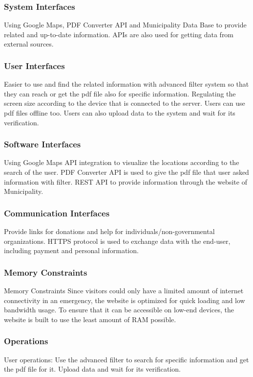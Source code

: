 \documentclass[12pt]{report}
\begin{document}
\subsubsection{System Interfaces}
Using Google Maps, PDF Converter API and Municipality Data Base to provide related and up-to-date information. APIs are also used for getting data from external sources.

\subsubsection{User Interfaces}
Easier to use and find the related information with advanced filter system so that they can reach or get the pdf file also for specific information. Regulating the screen size according to the device that is connected to the server. Users can use pdf files offline too. Users can also upload data to the system and wait for its verification.

\subsubsection{Software Interfaces}
Using Google Maps API integration to visualize the locations according to the search of the user. PDF Converter API is used to give the pdf file that user asked information with filter. REST API to provide information through the website of Municipality.

\subsubsection{Communication Interfaces}
Provide links for donations and help for individuals/non-governmental organizations. HTTPS protocol is used to exchange data with the end-user, including payment and personal information.

\subsubsection{Memory Constraints}
Memory Constraints Since visitors could only have a limited amount of internet connectivity in an emergency, the website is optimized for quick loading and low bandwidth usage. To ensure that it can be accessible on low-end devices, the website is built to use the least amount of RAM possible.

\subsubsection{Operations}
User operations: Use the advanced filter to search for specific information and get the pdf file for it. Upload data and wait for its verification.
\end{document}
